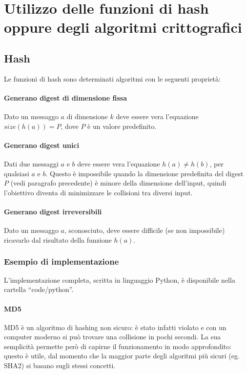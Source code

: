 \documentclass{article}
\begin{document}
\section{Utilizzo delle funzioni di hash oppure degli algoritmi crittografici}

\subsection{Hash}

Le funzioni di hash sono determinati algoritmi con le seguenti proprietà:

\paragraph{Generano digest di dimensione fissa}
Dato un messaggo $a$ di dimensione $k$ deve essere vera l'equazione $size(h(a)) = P$, dove $P$ è un valore predefinito.

\paragraph{Generano digest unici}
Dati due messaggi $a$ e $b$ deve essere vera l'equazione $h(a) \neq h(b)$, per qualsiasi $a$ e $b$. Questo è impossibile quando la dimensione predefinita del digest $P$ (vedi paragrafo precedente) è minore della dimensione dell'input, quindi l'obiettivo diventa di minimizzare le collisioni tra diversi input.

\paragraph{Generano digest irreversibili}
Dato un messaggo $a$, sconosciuto, deve essere difficile (se non impossibile) ricavarlo dal risultato della funzione $h(a)$.

\subsubsection{Esempio di implementazione}

\small{L'implementazione completa, scritta in linguaggio Python, è disponibile nella cartella ``code/python''.}

\paragraph{MD5}
MD5 è un algoritmo di hashing non sicuro: è stato infatti violato e con un computer moderno si può trovare una collisione in pochi secondi. La sua semplicità permette però di capirne il funzionamento in modo approfondito: questo è utile, dal momento che la maggior parte degli algoritmi più sicuri (eg. SHA2) si basano sugli stessi concetti.
\end{document}
